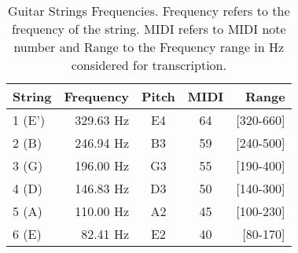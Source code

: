 \begin{table}
\centering
  \caption[Guitar Strings Frequencies.]{Guitar Strings Frequencies. Frequency refers to the frequency of the string. MIDI refers to MIDI note number and Range to the Frequency range in Hz considered for transcription.}
  \label{tab:guitar_strings}
  \begin{tabular}{  l r c c r }
    \hline
	String & Frequency & Pitch & MIDI & Range\\ \hline
    1 (E') & 329.63 Hz & E4 & 64 & [320-660]\\ 
    2 (B) & 246.94 Hz & B3 & 59 & [240-500]\\
    3 (G) & 196.00 Hz & G3 & 55 & [190-400]\\
    4 (D) & 146.83 Hz & D3 & 50 & [140-300]\\
    5 (A) & 110.00 Hz & A2 & 45 & [100-230]\\
    6 (E) & 82.41 Hz & E2 & 40 & [80-170]\\
    \hline
  \end{tabular}

\end{table}
